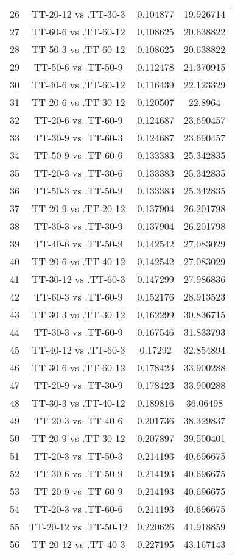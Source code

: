 \documentclass[a4paper,10pt]{article}
\begin{document}
\begin{landscape}
\begin{table}[!htp]
\begin{tabular}{cccc}
26&TT-20-12 vs .TT-30-3&0.104877&19.926714\\
27&TT-60-6 vs .TT-60-12&0.108625&20.638822\\
28&TT-50-3 vs .TT-60-12&0.108625&20.638822\\
29&TT-50-6 vs .TT-50-9&0.112478&21.370915\\
30&TT-40-6 vs .TT-60-12&0.116439&22.123329\\
31&TT-20-6 vs .TT-30-12&0.120507&22.8964\\
32&TT-20-6 vs .TT-60-9&0.124687&23.690457\\
33&TT-30-9 vs .TT-60-3&0.124687&23.690457\\
34&TT-50-9 vs .TT-60-6&0.133383&25.342835\\
35&TT-20-3 vs .TT-30-6&0.133383&25.342835\\
36&TT-50-3 vs .TT-50-9&0.133383&25.342835\\
37&TT-20-9 vs .TT-20-12&0.137904&26.201798\\
38&TT-30-3 vs .TT-30-9&0.137904&26.201798\\
39&TT-40-6 vs .TT-50-9&0.142542&27.083029\\
40&TT-20-6 vs .TT-40-12&0.142542&27.083029\\
41&TT-30-12 vs .TT-60-3&0.147299&27.986836\\
42&TT-60-3 vs .TT-60-9&0.152176&28.913523\\
43&TT-30-3 vs .TT-30-12&0.162299&30.836715\\
44&TT-30-3 vs .TT-60-9&0.167546&31.833793\\
45&TT-40-12 vs .TT-60-3&0.17292&32.854894\\
46&TT-30-6 vs .TT-60-12&0.178423&33.900288\\
47&TT-20-9 vs .TT-30-9&0.178423&33.900288\\
48&TT-30-3 vs .TT-40-12&0.189816&36.06498\\
49&TT-20-3 vs .TT-40-6&0.201736&38.329837\\
50&TT-20-9 vs .TT-30-12&0.207897&39.500401\\
51&TT-20-3 vs .TT-50-3&0.214193&40.696675\\
52&TT-30-6 vs .TT-50-9&0.214193&40.696675\\
53&TT-20-9 vs .TT-60-9&0.214193&40.696675\\
54&TT-20-3 vs .TT-60-6&0.214193&40.696675\\
55&TT-20-12 vs .TT-50-12&0.220626&41.918859\\
56&TT-20-12 vs .TT-40-3&0.227195&43.167143\\

\end{tabular}
\end{table}
\end{landscape}
\end{document}
